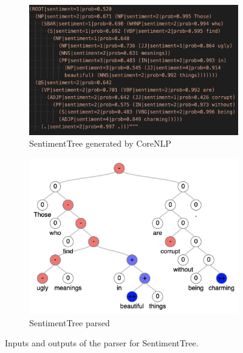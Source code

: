 \begin{figure}[!htbp]
     \centering
     \begin{subfigure}[b]{0.45\textwidth}
         \centering
         \includegraphics[width=\textwidth]{figures/sentiment_tree_2.png}
         \caption{SentimentTree generated by CoreNLP}
         \label{fig:raw_sentiment_tree}
     \end{subfigure}
     \hfill
     \begin{subfigure}[b]{0.45\textwidth}
         \centering
         \includegraphics[width=\textwidth]{figures/parse_tree.png}
         \caption{SentimentTree parsed}
         \label{fig:parsed_sentiment_tree}
     \end{subfigure}
        \caption{Inputs and outputs of the parser for SentimentTree.}
        \label{fig:parsing_sentiment_tree}
\end{figure}

